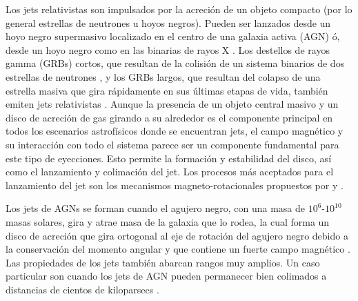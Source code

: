 \documentclass[12pt,a4paper]{book}
\begin{document}
Los jets relativistas son impulsados por la acreción de un objeto compacto (por lo general estrellas de neutrones u hoyos negros). Pueden ser lanzados desde un hoyo negro supermasivo localizado en el 
centro de una galaxia activa (AGN) \citep{2019ARA&A..57..467B} ó, desde un hoyo negro como en las binarias de rayos X \citep{2020ApJ...895L..31E}. Los destellos de rayos gamma (GRBs) cortos, que resultan de la colisión 
de un sistema binarios de dos estrellas de neutrones \citep{2021MNRAS.506.3483P}, y los GRBs largos, que resultan del colapso de una estrella masiva que gira rápidamente en sus últimas etapas de 
vida, también emiten jets relativistas \citep{2022MNRAS.509.5964S}.
Aunque la presencia de un objeto central masivo y un disco de acreción de gas girando a su alrededor es el componente principal en todos los escenarios astrofísicos donde se encuentran jets, el campo magnético y su 
interacción con todo el sistema parece ser un componente fundamental para este tipo de eyecciones. Esto permite la formación y estabilidad del disco, así como el lanzamiento y colimación del jet. Los procesos más 
aceptados para el lanzamiento del jet son los mecanismos magneto-rotacionales propuestos por \citet{1977MNRAS.179..433B} y \citet{1982MNRAS.199..883B}.


Los jets de AGNs se forman cuando el agujero negro, con una masa de $10^6$-$10^{10}$ masas solares, gira y atrae masa de la galaxia que lo rodea, la cual forma un disco de acreción
que gira ortogonal al eje de rotación del agujero negro debido a la conservación del momento angular y que contiene un fuerte campo magnético \citep{2008ICRC....5.1405H}. %
Las propiedades de los jets también abarcan rangos muy amplios. Un caso particular son cuando los jets de AGN pueden permanecer bien colimados a distancias de cientos de kiloparsecs \citep{2021Romero}. %
\end{document}
